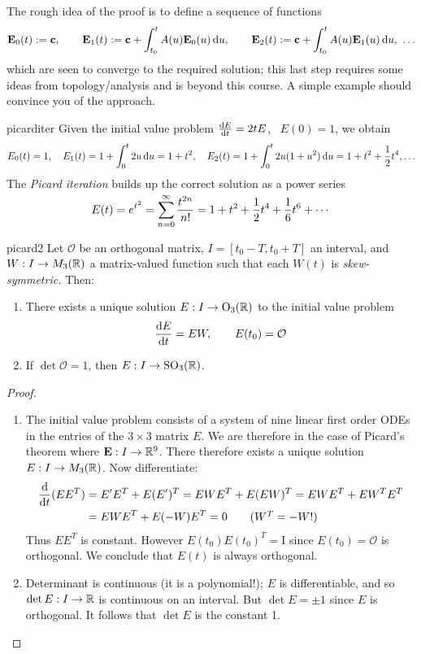 \goodbreak

The rough idea of the proof is to define a sequence of functions
\[\vE_0(t):=\vc,\qquad \vE_1(t):=\vc+\int_{t_0}^tA(u)\vE_0(u)\,\du,\qquad \vE_2(t):=\vc+\int_{t_0}^tA(u)\vE_1(u)\,\du,\ \ldots\]
which are seen to converge to the required solution; this last step requires some ideas from topology/analysis and is beyond this course. A simple example should convince you of the approach.

\begin{example}{}{picarditer}
Given the initial value problem $\diff[E]{t}=2tE$, \ $E(0)=1$, we obtain
\begin{gather*}
E_0(t)=1,\quad E_1(t)=1+\int_0^t 2u\,\du=1+t^2,\quad
E_2(t)=1+\int_0^t2u(1+u^2)\,\du =1+t^2+\frac 12t^4,\ldots
\end{gather*}
The \emph{Picard iteration} builds up the correct solution as a power series
\[E(t)=e^{t^2}=\smash[t]{\sum\limits_{n=0}^\infty\frac{t^{2n}}{n!}}=1+t^2+\frac 12t^4+\frac 16t^6+\cdots\]
\end{example}



\begin{cor}{}{picard2}
Let $\mathcal O$ be an orthogonal matrix, $I=[t_0-T,t_0+T]$ an interval, and $W:I\to M_3(\R)$ a matrix-valued function such that each $W(t)$ is \emph{skew-symmetric.}  Then:
\begin{enumerate}\itemsep0pt
  \item There exists a unique solution $E:I\to \rO_3(\R)$ to the initial value problem
  \[
  	\diff[E]{t}=E W,\qquad E(t_0)=\mathcal O
  \]
  \item If $\det\mathcal O=1$, then $E:I\to\rSO_3(\R)$.
\end{enumerate}
\end{cor}

\begin{proof}
\begin{enumerate}
  \item The initial value problem consists of a system of nine linear first order ODEs in the entries of the $3\times 3$ matrix $E$. We are therefore in the case of Picard's theorem where $\vE:I\to\R^9$. There therefore exists a unique solution $E:I\to M_3(\R)$. Now differentiate:
  \begin{align*}
  \diff t(EE^T)&=E'E^T+E(E')^T =EWE^T+E(EW)^T=EWE^T+EW^TE^T\\
  &=EWE^T+E(-W)E^T=0 \tag{$W^T=-W$!}
  \end{align*}
  Thus $EE^T$ is constant. However $E(t_0)E(t_0)^T=\mathrm I$ since $E(t_0)=\mathcal O$ is orthogonal. We conclude that $E(t)$ is always orthogonal.
  \item Determinant is continuous (it is a polynomial!); $E$ is differentiable, and so $\det E:I\to\R$ is continuous on an interval. But $\det E=\pm 1$ since $E$ is orthogonal. It follows that $\det E$ is the constant 1.\qedhere
\end{enumerate}
\end{proof}

